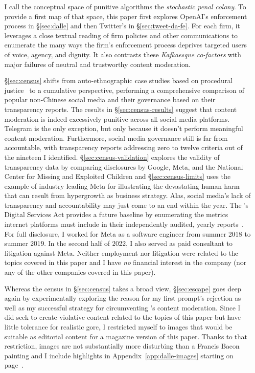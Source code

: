 I call the conceptual space of punitive algorithms the \emph{stochastic penal
colony}. To provide a first map of that space, this paper first explores
OpenAI's enforcement process in \S\ref{sec:dalle} and then Twitter's in
\S\ref{sec:tweet-da-fe}. For each firm, it leverages a close textual reading of
firm policies and other communications to enumerate the many ways the firm's
enforcement process deprives targeted users of voice, agency, and dignity. It
also contrasts these \emph{Kafkaesque co-factors} with major failures of neutral
and trustworthy content moderation.

\S\ref{sec:census} shifts from auto-ethnographic case studies based on
procedural justice~\cite{Tyler2003,Tyler2006,Tyler2007} to a cumulative
perspective, performing a comprehensive comparison of popular non-Chinese social
media and their governance based on their transparency reports. The results in
\S\ref{sec:census-results} suggest that content moderation is indeed excessively
punitive across all social media platforms. Telegram is the only exception, but
only because it doesn't perform meaningful content moderation. Furthermore,
social media governance still is far from accountable, with transparency reports
addressing zero to twelve criteria out of the nineteen I identified.
\S\ref{sec:census-validation} explores the validity of transparency data by
comparing disclosures by Google, Meta, and the National Center for Missing and
Exploited Children and \S\ref{sec:census-limits} uses the example of
industry-leading Meta for illustrating the devastating human harm that can
result from hypergrowth as business strategy. Alas, social media's lack of
transparency and accountability may just come to an end within the year. The
's Digital Services Act provides a future baseline by enumerating the
metrics internet platforms must include in their independently audited, yearly
reports~\cite{EuropeanParliamentAndCouncil2022}. For full disclosure, I worked
for Meta as a software engineer from summer 2018 to summer 2019. In the second
half of 2022, I also served as paid consultant to litigation against Meta.
Neither employment nor litigation were related to the topics covered in this
paper and I have \emph{no} financial interest in the company (nor any of the
other companies covered in this paper).

Whereas the census in \S\ref{sec:census} takes a broad view, \S\ref{sec:escape}
goes deep again by experimentally exploring the reason for my first prompt's
rejection as well as my successful strategy for circumventing \DALLE's content
moderation. Since I did seek to create violative content related to the topics
of this paper but have little tolerance for realistic gore, I restricted myself
to images that would be suitable as editorial content for a magazine version of
this paper. Thanks to that restriction, images are not substantially more
disturbing than a Francis Bacon painting and I include highlights in
Appendix~\ref{app:dalle-images} starting on page~\pageref{app:dalle-images}.

